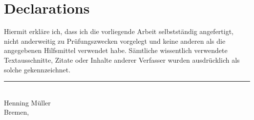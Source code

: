 \chapter*{Declarations}

Hiermit erkläre ich, dass ich die vorliegende Arbeit selbstständig angefertigt,
nicht anderweitig zu Prüfungszwecken vorgelegt und keine anderen als die
angegebenen Hilfsmittel verwendet habe. Sämtliche wissentlich verwendete
Textausschnitte, Zitate oder Inhalte anderer Verfasser wurden ausdrücklich als
solche gekennzeichnet.

\begin{flushright}
	\vspace*{5em}
	\rule{17.5em}{0.25pt}\\
	Henning Müller\\
	\small{Bremen, \datede}
\end{flushright}
